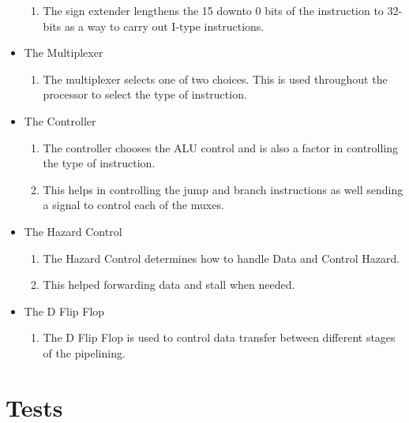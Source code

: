 \documentclass[paper=letter, fontsize=11pt]{scrartcl} %
\numberwithin{equation}{section}
\numberwithin{figure}{section}
\numberwithin{table}{section}
\begin{document}
\begin{itemize}
	\begin{enumerate}
		\item The sign extender lengthens the 15 downto 0 bits of the instruction to 32-bits as a way to carry out I-type instructions.
	\end{enumerate}
	\item The Multiplexer
	\begin{enumerate}
		\item The multiplexer selects one of two choices. This is used throughout the processor to select the type of instruction.
	\end{enumerate}
	\item The Controller
	\begin{enumerate}
		\item The controller chooses the ALU control and is also a factor in controlling the type of instruction.
		\item This helps in controlling the jump and branch instructions as well sending a signal to control each of the muxes.
	\end{enumerate}
	\item The Hazard Control
		\begin{enumerate}
		\item The Hazard Control determines how to handle Data and Control Hazard.
		\item This helped forwarding data and stall when needed.
	\end{enumerate}
	\item The D Flip Flop
	\begin{enumerate}
		\item The D Flip Flop is used to control data transfer between different stages of the pipelining.
	\end{enumerate}

\end{itemize}

\pagebreak


\section{Tests}
\end{document}
